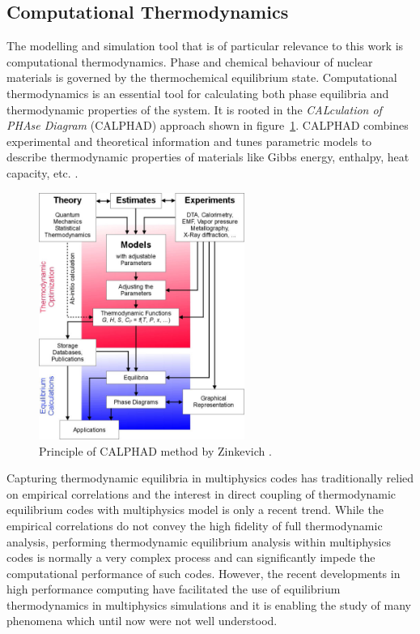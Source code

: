 \subsection{Computational Thermodynamics}
    The modelling and simulation tool that is of particular relevance to this work is computational thermodynamics. Phase and chemical behaviour of nuclear materials is governed by the thermochemical equilibrium state. Computational thermodynamics is an essential tool for calculating both phase equilibria and thermodynamic properties of the system. It is rooted in the \emph{CALculation of PHAse Diagram} (CALPHAD) approach shown in figure~\ref{fig:calphad}. CALPHAD combines experimental and theoretical information and tunes parametric models to describe thermodynamic properties of materials like Gibbs energy, enthalpy, heat capacity, etc. \cite{Lukas07}.
	\begin{figure}[htb]
		\centering
		\includegraphics[width=0.6\textwidth]{figures/chapter-1/Calphad_method}
		\caption[Principle of CALPHAD method]{Principle of CALPHAD method by Zinkevich \cite{Zinkevich:2003aa}.}
		\label{fig:calphad}
	\end{figure}

	Capturing thermodynamic equilibria in multiphysics codes has traditionally relied on empirical correlations and the interest in direct coupling of thermodynamic equilibrium codes with multiphysics model is only a recent trend. While the empirical correlations do not convey the high fidelity of full thermodynamic analysis, performing thermodynamic equilibrium analysis within multiphysics codes is normally a very complex process and can significantly impede the computational performance of such codes. However, the recent developments in high performance computing have facilitated the use of equilibrium thermodynamics in multiphysics  simulations and it is enabling the study of many phenomena which until now were not well understood.
	
